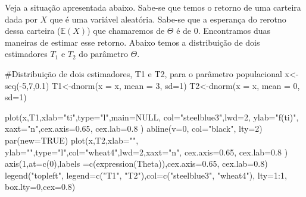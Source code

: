 \documentclass[
  letterpaper,
  DIV=11,
  numbers=noendperiod]{scrartcl}
\newenvironment{Shaded}{\begin{snugshade}}{\end{snugshade}}
\newcommand{\AttributeTok}[1]{\textcolor[rgb]{0.40,0.45,0.13}{#1}}
\newcommand{\CommentTok}[1]{\textcolor[rgb]{0.37,0.37,0.37}{#1}}
\newcommand{\ConstantTok}[1]{\textcolor[rgb]{0.56,0.35,0.01}{#1}}
\newcommand{\DecValTok}[1]{\textcolor[rgb]{0.68,0.00,0.00}{#1}}
\newcommand{\FloatTok}[1]{\textcolor[rgb]{0.68,0.00,0.00}{#1}}
\newcommand{\FunctionTok}[1]{\textcolor[rgb]{0.28,0.35,0.67}{#1}}
\newcommand{\NormalTok}[1]{\textcolor[rgb]{0.00,0.23,0.31}{#1}}
\newcommand{\OtherTok}[1]{\textcolor[rgb]{0.00,0.23,0.31}{#1}}
\newcommand{\SpecialCharTok}[1]{\textcolor[rgb]{0.37,0.37,0.37}{#1}}
\newcommand{\StringTok}[1]{\textcolor[rgb]{0.13,0.47,0.30}{#1}}
\begin{document}
Veja a situação apresentada abaixo. Sabe-se que temos o retorno de uma
carteira dada por \(X\) que é uma variável aleatória. Sabe-se que a
esperança do rerotno dessa carteira (\(\mathbb{E}(X)\)) que chamaremos
de \(\Theta\) é de 0. Encontramos duas maneiras de estimar esse retorno.
Abaixo temos a distribuição de dois estimadores \(T_1\) e \(T_2\) do
parâmetro \(\Theta\).

\begin{Shaded}
\begin{Highlighting}[]
\CommentTok{\#Distribuição de dois estimadores, T1 e T2,  para o parâmetro populacional}
\NormalTok{x}\OtherTok{\textless{}{-}}\FunctionTok{seq}\NormalTok{(}\SpecialCharTok{{-}}\DecValTok{5}\NormalTok{,}\DecValTok{7}\NormalTok{,}\FloatTok{0.1}\NormalTok{) }
\NormalTok{T1}\OtherTok{\textless{}{-}}\FunctionTok{dnorm}\NormalTok{(}\AttributeTok{x =}\NormalTok{ x, }\AttributeTok{mean =} \DecValTok{3}\NormalTok{, }\AttributeTok{sd=}\DecValTok{1}\NormalTok{)   }
\NormalTok{T2}\OtherTok{\textless{}{-}}\FunctionTok{dnorm}\NormalTok{(}\AttributeTok{x =}\NormalTok{ x, }\AttributeTok{mean =} \DecValTok{0}\NormalTok{, }\AttributeTok{sd=}\DecValTok{1}\NormalTok{)}

\FunctionTok{plot}\NormalTok{(x,T1,}\AttributeTok{xlab=}\StringTok{"ti"}\NormalTok{,}\AttributeTok{type=}\StringTok{"l"}\NormalTok{,}\AttributeTok{main=}\ConstantTok{NULL}\NormalTok{, }\AttributeTok{col=}\StringTok{"steelblue3"}\NormalTok{,}\AttributeTok{lwd=}\DecValTok{2}\NormalTok{, }\AttributeTok{ylab=}\StringTok{"f(ti)"}\NormalTok{,}
     \AttributeTok{xaxt=}\StringTok{"n"}\NormalTok{,}\AttributeTok{cex.axis=}\FloatTok{0.65}\NormalTok{, }\AttributeTok{cex.lab=}\FloatTok{0.8}\NormalTok{ ) }
\FunctionTok{abline}\NormalTok{(}\AttributeTok{v=}\DecValTok{0}\NormalTok{, }\AttributeTok{col=}\StringTok{"black"}\NormalTok{, }\AttributeTok{lty=}\DecValTok{2}\NormalTok{)}
\FunctionTok{par}\NormalTok{(}\AttributeTok{new=}\ConstantTok{TRUE}\NormalTok{)}
\FunctionTok{plot}\NormalTok{(x,T2,}\AttributeTok{xlab=}\StringTok{""}\NormalTok{, }\AttributeTok{ylab=}\StringTok{""}\NormalTok{,}\AttributeTok{type=}\StringTok{"l"}\NormalTok{,}\AttributeTok{col=}\StringTok{"wheat4"}\NormalTok{,}\AttributeTok{lwd=}\DecValTok{2}\NormalTok{,}\AttributeTok{xaxt=}\StringTok{"n"}\NormalTok{,}
     \AttributeTok{cex.axis=}\FloatTok{0.65}\NormalTok{, }\AttributeTok{cex.lab=}\FloatTok{0.8}\NormalTok{ ) }
\FunctionTok{axis}\NormalTok{(}\DecValTok{1}\NormalTok{,}\AttributeTok{at=}\FunctionTok{c}\NormalTok{(}\DecValTok{0}\NormalTok{),}\AttributeTok{labels =}\FunctionTok{c}\NormalTok{(}\FunctionTok{expression}\NormalTok{(Theta)),}\AttributeTok{cex.axis=}\FloatTok{0.65}\NormalTok{, }\AttributeTok{cex.lab=}\FloatTok{0.8}\NormalTok{) }
\FunctionTok{legend}\NormalTok{(}\StringTok{"topleft"}\NormalTok{, }\AttributeTok{legend=}\FunctionTok{c}\NormalTok{(}\StringTok{"T1"}\NormalTok{, }\StringTok{"T2"}\NormalTok{),}\AttributeTok{col=}\FunctionTok{c}\NormalTok{(}\StringTok{"steelblue3"}\NormalTok{, }\StringTok{"wheat4"}\NormalTok{), }
       \AttributeTok{lty=}\DecValTok{1}\SpecialCharTok{:}\DecValTok{1}\NormalTok{, }\AttributeTok{box.lty=}\DecValTok{0}\NormalTok{,}\AttributeTok{cex=}\FloatTok{0.8}\NormalTok{)}
\end{Highlighting}
\end{Shaded}
\end{document}
